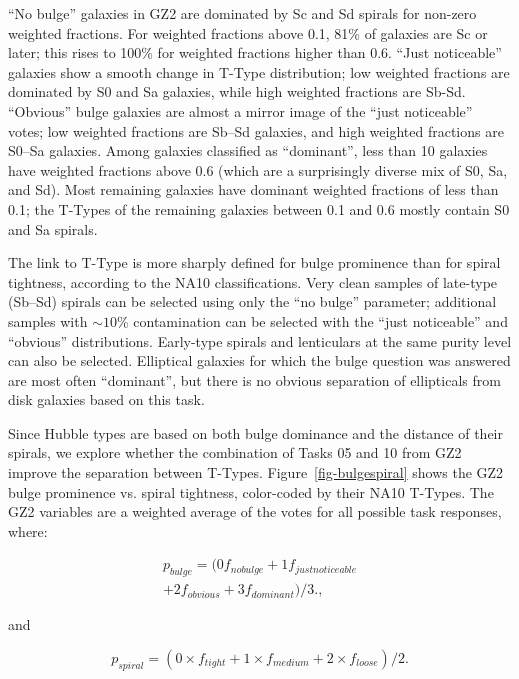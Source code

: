 \documentclass[useAMS,usenatbib]{mn2e}
\begin{document}
``No bulge'' galaxies in GZ2 are dominated by Sc and Sd spirals for non-zero weighted fractions. For weighted fractions above 0.1, 81\% of galaxies are Sc or later; this rises to 100\% for weighted fractions higher than 0.6. ``Just noticeable'' galaxies show a smooth change in T-Type distribution; low weighted fractions are dominated by S0 and Sa galaxies, while high weighted fractions are Sb-Sd. ``Obvious'' bulge galaxies are almost a mirror image of the ``just noticeable'' votes; low weighted fractions are Sb--Sd galaxies, and high weighted fractions are S0--Sa galaxies. Among galaxies classified as ``dominant'', less than 10 galaxies have weighted fractions above 0.6 (which are a surprisingly diverse mix of S0, Sa, and Sd). Most remaining galaxies have dominant weighted fractions of less than 0.1; the T-Types of the remaining galaxies between 0.1 and 0.6 mostly contain S0 and Sa spirals. 

The link to T-Type is more sharply defined for bulge prominence than for spiral tightness, according to the NA10 classifications. Very clean samples of late-type (Sb--Sd) spirals can be selected using only the ``no bulge'' parameter; additional samples with $\sim10$\% contamination can be selected with the ``just noticeable'' and ``obvious'' distributions. Early-type spirals and lenticulars at the same purity level can also be selected. Elliptical galaxies for which the bulge question was answered are most often ``dominant'', but there is no obvious separation of ellipticals from disk galaxies based on this task. 

Since Hubble types are based on both bulge dominance and the distance of their spirals, we explore whether the combination of Tasks 05 and 10 from GZ2 improve the separation between T-Types. Figure~\ref{fig-bulgespiral} shows the GZ2 bulge prominence vs. spiral tightness, color-coded by their NA10 T-Types. The GZ2 variables are a weighted average of the votes for all possible task responses, where:

\begin{eqnarray}
\label{eqn-wbulge}
p_{bulge} = (0f_{nobulge} + 1f_{justnoticeable} \\
            + 2f_{obvious} + 3f_{dominant}) / 3., \nonumber
\end{eqnarray}

\noindent and 

\begin{equation}
\label{eqn-wspiral}
p_{spiral} = (0 \times f_{tight} + 1 \times f_{medium} + 2 \times f_{loose}) / 2.
\end{equation}
\end{document}
